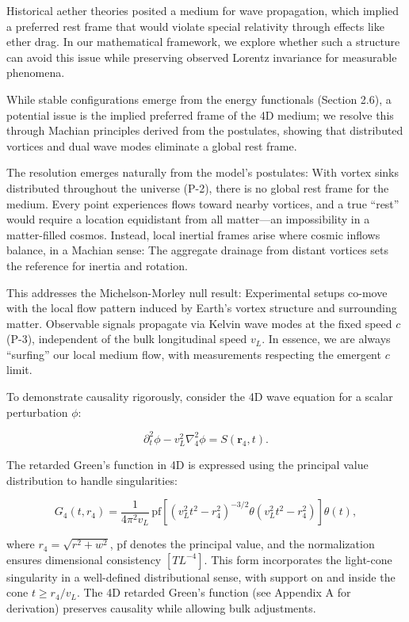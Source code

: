 Historical aether theories posited a medium for wave propagation, which implied a preferred rest frame that would violate special relativity through effects like ether drag. In our mathematical framework, we explore whether such a structure can avoid this issue while preserving observed Lorentz invariance for measurable phenomena.

While stable configurations emerge from the energy functionals (Section 2.6), a potential issue is the implied preferred frame of the 4D medium; we resolve this through Machian principles derived from the postulates, showing that distributed vortices and dual wave modes eliminate a global rest frame.

The resolution emerges naturally from the model's postulates: With vortex sinks distributed throughout the universe (P-2), there is no global rest frame for the medium. Every point experiences flows toward nearby vortices, and a true ``rest'' would require a location equidistant from all matter---an impossibility in a matter-filled cosmos. Instead, local inertial frames arise where cosmic inflows balance, in a Machian sense: The aggregate drainage from distant vortices sets the reference for inertia and rotation.

This addresses the Michelson-Morley null result: Experimental setups co-move with the local flow pattern induced by Earth's vortex structure and surrounding matter. Observable signals propagate via Kelvin wave modes at the fixed speed $c$ (P-3), independent of the bulk longitudinal speed $v_L$. In essence, we are always ``surfing'' our local medium flow, with measurements respecting the emergent $c$ limit.

To demonstrate causality rigorously, consider the 4D wave equation for a scalar perturbation $\phi$:

\begin{equation}
\partial_t^2 \phi - v_L^2 \nabla_4^2 \phi = S(\mathbf{r}_4, t).
\end{equation}

The retarded Green's function in 4D is expressed using the principal value distribution to handle singularities:

\begin{equation}
G_4(t, r_4) = \frac{1}{4 \pi^2 v_L} \, \text{pf} \left[ (v_L^2 t^2 - r_4^2)^{-3/2} \theta(v_L^2 t^2 - r_4^2) \right] \theta(t),
\end{equation}

where $r_4 = \sqrt{r^2 + w^2}$, $\text{pf}$ denotes the principal value, and the normalization ensures dimensional consistency $[T L^{-4}]$. This form incorporates the light-cone singularity in a well-defined distributional sense, with support on and inside the cone $t \geq r_4 / v_L$. The 4D retarded Green's function (see Appendix A for derivation) preserves causality while allowing bulk adjustments.

